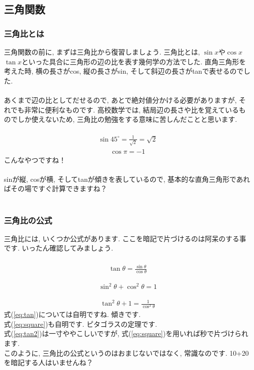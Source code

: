 \documentclass[11pt,a4paper]{jsarticle}
\begin{document}
\subsection{三角関数}
\subsubsection{三角比とは}
三角関数の前に, まずは三角比から復習しましょう. 三角比とは, $\sin x$や$\cos x$ $\tan x$といった具合に三角形の辺の比を表す幾何学の方法でした. 直角三角形を考えた時, 横の長さがcos, 縦の長さがsin, そして斜辺の長さがtanで表せるのでした. \\
\\
あくまで辺の比としてだせるので, あとで絶対値分かける必要がありますが, それでも非常に便利なものです. 高校数学では, 結局辺の長さや比を覚えているものでしか使えないため, 三角比の勉強をする意味に苦しんだことと思います.\\
\\
\begin{eqnarray}
\sin 45^\circ = \frac{1}{\sqrt{2}} = \sqrt{2}
\end{eqnarray}
\begin{eqnarray}
\cos \pi = -1
\end{eqnarray}
こんなやつですね！\\
\\
sinが縦, cosが横, そしてtanが傾きを表しているので, 基本的な直角三角形であればその場ですぐ計算できますね？\\
\\
\subsubsection{三角比の公式}
三角比には, いくつか公式があります. ここを暗記で片づけるのは阿呆のする事です. いったん確認してみましょう.\\
\\
\begin{eqnarray}
\tan \theta = \frac{\sin\theta}{\cos\theta}
\label{eq:tan}
\end{eqnarray}

\begin{eqnarray}
\sin^2 \theta + \cos^2\theta = 1
\label{eq:square}
\end{eqnarray}

\begin{eqnarray}
\tan^2\theta + 1 = \frac{1}{\cos^2\theta}
\label{eq:tan2}
\end{eqnarray}
式(\ref{eq:tan})については自明ですね. 傾きです.\\
式(\ref{eq:square})も自明です. ピタゴラスの定理です.\\
式(\ref{eq:tan2})は一寸ややこしいですが, 式(\ref{eq:square})を用いれば秒で片づけられます. \\
このように, 三角比の公式というのはおまじないではなく, 常識なのです. 10+20を暗記する人はいませんね？\\
\end{document}
